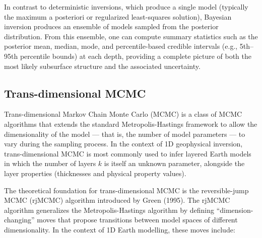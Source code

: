 In contrast to deterministic inversions, which produce a single model (typically the maximum a posteriori or regularized least-squares solution), Bayesian inversion produces an ensemble of models sampled from the posterior distribution. From this ensemble, one can compute summary statistics such as the posterior mean, median, mode, and percentile-based credible intervals (e.g., 5th--95th percentile bounds) at each depth, providing a complete picture of both the most likely subsurface structure and the associated uncertainty.

\subsection{Trans-dimensional MCMC}

Trans-dimensional Markov Chain Monte Carlo (MCMC) is a class of MCMC algorithms that extends the standard Metropolis-Hastings framework to allow the dimensionality of the model --- that is, the number of model parameters --- to vary during the sampling process. In the context of 1D geophysical inversion, trans-dimensional MCMC is most commonly used to infer layered Earth models in which the number of layers $k$ is itself an unknown parameter, alongside the layer properties (thicknesses and physical property values).

The theoretical foundation for trans-dimensional MCMC is the reversible-jump MCMC (rjMCMC) algorithm introduced by Green (1995). The rjMCMC algorithm generalizes the Metropolis-Hastings algorithm by defining ``dimension-changing'' moves that propose transitions between model spaces of different dimensionality. In the context of 1D Earth modelling, these moves include:

